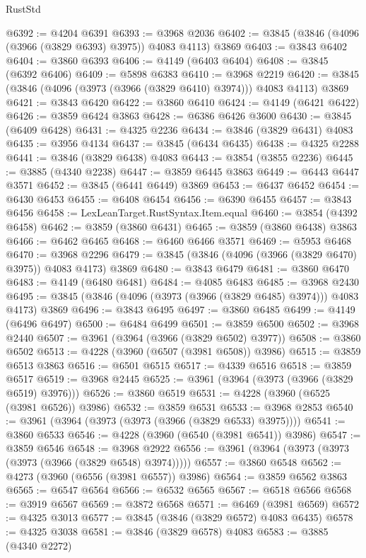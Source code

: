 \begin{lexlean}{RustStd}
\begin{coremodule}
@6392 := @4204 @6391
@6393 := @3968 @2036
@6402 := @3845 (@3846 (@4096 (@3966 (@3829 @6393) @3975)) @4083 @4113) @3869
@6403 := @3843 @6402
@6404 := @3860 @6393
@6406 := @4149 (@6403 @6404)
@6408 := @3845 (@6392 @6406)
@6409 := @5898 @6383
@6410 := @3968 @2219
@6420 := @3845 (@3846 (@4096 (@3973 (@3966 (@3829 @6410) @3974))) @4083 @4113) @3869
@6421 := @3843 @6420
@6422 := @3860 @6410
@6424 := @4149 (@6421 @6422)
@6426 := @3859 @6424 @3863
@6428 := @6386 @6426 @3600
@6430 := @3845 (@6409 @6428)
@6431 := @4325 @2236
@6434 := @3846 (@3829 @6431) @4083
@6435 := @3956 @4134
@6437 := @3845 (@6434 @6435)
@6438 := @4325 @2288
@6441 := @3846 (@3829 @6438) @4083
@6443 := @3854 (@3855 @2236)
@6445 := @3885 (@4340 @2238)
@6447 := @3859 @6445 @3863
@6449 := @6443 @6447 @3571
@6452 := @3845 (@6441 @6449) @3869
@6453 := @6437 @6452
@6454 := @6430 @6453
@6455 := @6408 @6454
@6456 := @6390 @6455
@6457 := @3843 @6456
@6458 := LexLeanTarget.RustSyntax.Item.equal
@6460 := @3854 (@4392 @6458)
@6462 := @3859 (@3860 @6431)
@6465 := @3859 (@3860 @6438) @3863
@6466 := @6462 @6465
@6468 := @6460 @6466 @3571
@6469 := @5953 @6468
@6470 := @3968 @2296
@6479 := @3845 (@3846 (@4096 (@3966 (@3829 @6470) @3975)) @4083 @4173) @3869
@6480 := @3843 @6479
@6481 := @3860 @6470
@6483 := @4149 (@6480 @6481)
@6484 := @4085 @6483
@6485 := @3968 @2430
@6495 := @3845 (@3846 (@4096 (@3973 (@3966 (@3829 @6485) @3974))) @4083 @4173) @3869
@6496 := @3843 @6495
@6497 := @3860 @6485
@6499 := @4149 (@6496 @6497)
@6500 := @6484 @6499
@6501 := @3859 @6500
@6502 := @3968 @2440
@6507 := @3961 (@3964 (@3966 (@3829 @6502) @3977))
@6508 := @3860 @6502
@6513 := @4228 (@3960 (@6507 (@3981 @6508)) @3986)
@6515 := @3859 @6513 @3863
@6516 := @6501 @6515
@6517 := @4339 @6516
@6518 := @3859 @6517
@6519 := @3968 @2445
@6525 := @3961 (@3964 (@3973 (@3966 (@3829 @6519) @3976)))
@6526 := @3860 @6519
@6531 := @4228 (@3960 (@6525 (@3981 @6526)) @3986)
@6532 := @3859 @6531
@6533 := @3968 @2853
@6540 := @3961 (@3964 (@3973 (@3973 (@3966 (@3829 @6533) @3975))))
@6541 := @3860 @6533
@6546 := @4228 (@3960 (@6540 (@3981 @6541)) @3986)
@6547 := @3859 @6546
@6548 := @3968 @2922
@6556 := @3961 (@3964 (@3973 (@3973 (@3973 (@3966 (@3829 @6548) @3974)))))
@6557 := @3860 @6548
@6562 := @4273 (@3960 (@6556 (@3981 @6557)) @3986)
@6564 := @3859 @6562 @3863
@6565 := @6547 @6564
@6566 := @6532 @6565
@6567 := @6518 @6566
@6568 := @3919 @6567
@6569 := @3872 @6568
@6571 := @6469 (@3981 @6569)
@6572 := @4325 @3013
@6577 := @3845 (@3846 (@3829 @6572) @4083 @6435)
@6578 := @4325 @3038
@6581 := @3846 (@3829 @6578) @4083
@6583 := @3885 (@4340 @2272)

\end{coremodule}
\end{lexlean}
